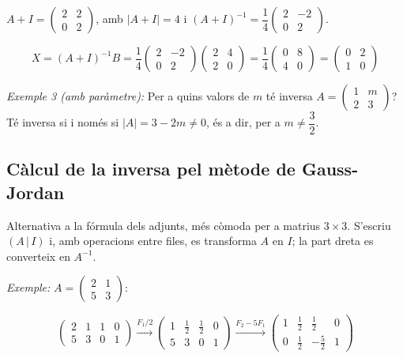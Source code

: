 $A+I=\begin{pmatrix}2&2\\0&2\end{pmatrix}$, amb $|A+I|=4$ i $(A+I)^{-1}=\dfrac14\begin{pmatrix}2&-2\\0&2\end{pmatrix}$.

\begin{equation*}
X=(A+I)^{-1}B=\frac14\begin{pmatrix}2&-2\\0&2\end{pmatrix}\begin{pmatrix}2&4\\2&0\end{pmatrix}=\frac14\begin{pmatrix}0&8\\4&0\end{pmatrix}=\begin{pmatrix}0&2\\1&0\end{pmatrix}
\end{equation*}

\emph{Exemple 3 (amb paràmetre):} Per a quins valors de $m$ té inversa $A=\begin{pmatrix}1&m\\2&3\end{pmatrix}$? Té inversa si i només si $|A|=3-2m\neq0$, és a dir, per a $m\neq\dfrac32$.

\subsection{Càlcul de la inversa pel mètode de Gauss-Jordan}

Alternativa a la fórmula dels adjunts, més còmoda per a matrius $3\times3$. S'escriu $(A\,|\,I)$ i, amb operacions entre files, es transforma $A$ en $I$; la part dreta es converteix en $A^{-1}$.

\emph{Exemple:} $A=\begin{pmatrix}2&1\\5&3\end{pmatrix}$:

\begin{equation*}
\left(\begin{array}{cc|cc}2&1&1&0\\5&3&0&1\end{array}\right)\xrightarrow{F_1/2}\left(\begin{array}{cc|cc}1&\frac12&\frac12&0\\5&3&0&1\end{array}\right)\xrightarrow{F_2-5F_1}\left(\begin{array}{cc|cc}1&\frac12&\frac12&0\\0&\frac12&-\frac52&1\end{array}\right)
\end{equation*}

